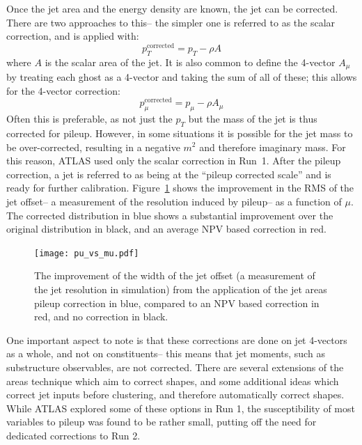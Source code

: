 
Once the jet area and the energy density are known, the jet can be corrected. There are two approaches to this-- the simpler one is referred to as the scalar correction, and is applied with:
%
\begin{equation}
p_T^{\mathrm{corrected}} = p_T - \rho A
\end{equation}
%
where $A$ is the scalar area of the jet. It is also common to define the 4-vector $A_\mu$ by treating each ghost as a 4-vector and taking the sum of all of these; this allows for the 4-vector correction:
%
\begin{equation}
p_\mu^{\mathrm{corrected}} = p_\mu - \rho A_\mu
\end{equation}
%
Often this is preferable, as not just the $p_T$ but the mass of the jet is thus corrected for pileup. However, in some situations it is possible for the jet mass to be over-corrected, resulting in a negative $m^2$ and therefore imaginary mass. For this reason, ATLAS used only the scalar correction in Run~1. After the pileup correction, a jet is referred to as being at the ``pileup corrected scale'' and is ready for further calibration. Figure~\ref{fig:jet-reconstruction:jet-pu-vs-mu} shows the improvement in the RMS of the jet offset-- a measurement of the resolution induced by pileup-- as a function of $\mu$. The corrected distribution in blue shows a substantial improvement over the original distribution in black, and an average NPV based correction in red.


\begin{figure}
\centering
\texttt{[image: pu\_vs\_mu.pdf]}
\label{fig:jet-reconstruction:jet-pu-vs-mu}
\caption{The improvement of the width of the jet offset (a measurement of the jet resolution in simulation) from the application of the jet areas pileup correction in blue, compared to an NPV based correction in red, and no correction in black.}
\end{figure}


One important aspect to note is that these corrections are done on jet 4-vectors as a whole, and not on constituents-- this means that jet moments, such as substructure observables, are not corrected. There are several extensions of the areas technique which aim to correct shapes, and some additional ideas which correct jet inputs before clustering, and therefore automatically correct shapes. While ATLAS explored some of these options in Run 1, the susceptibility of most variables to pileup was found to be rather small, putting off the need for dedicated corrections to Run 2. 


